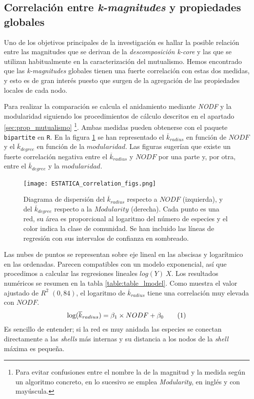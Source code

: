 \subsection{Correlación entre \textit{k-magnitudes} y propiedades globales}
\label{subsection:Correlacion}

Uno de los objetivos principales de la investigación es hallar la posible relación entre las magnitudes que se derivan de la \textit{descomposición k-core} y las que se utilizan habitualmente en la caracterización del mutualismo. Hemos encontrado que las \textit{k-magnitudes} globales tienen una fuerte correlación con estas dos medidas, y esto es de gran interés puesto que surgen de la agregación de las propiedades locales de cada nodo.

Para realizar la comparación se calcula el anidamiento mediante \textit{NODF} y la modularidad siguiendo los procedimientos de cálculo descritos en el apartado \ref{sec:prop_mutualismo} \footnote{Para evitar confusiones entre el nombre la de la magnitud y la medida según un algoritmo concreto, en lo sucesivo se emplea \textit{Modularity}, en inglés y con mayúscula.}. Ambas medidas pueden obtenerse con el paquete \texttt{bipartite} en \texttt{R}. En la figura \ref{fig:ESTATICA_corrfigs} se han representado el $\overline {k}_{radius}$ en función de $NODF$ y el $\overline {k}_{degree}$ en función de la $modularidad$. Las figuras sugerían que existe un fuerte correlación negativa entre el $\overline {k}_{radius}$ y $NODF$ por una parte y, por otra, entre el $\overline {k}_{degree}$ y la $modularidad$. 

\begin{figure}[h!]
\centering
\texttt{[image: ESTATICA\_correlation\_figs.png]}
\caption {Diagrama de dispersión del $\overline {k}_{radius}$ respecto a $NODF$ (izquierda), y del $\overline {k}_{degree}$ respecto a la $Modularity$ (derecha). Cada punto es una red, su área es proporcional al logaritmo del número de especies y el color indica la clase de comunidad. Se han incluido las líneas de regresión con sus intervalos de confianza en sombreado.}
\label{fig:ESTATICA_corrfigs}
\end{figure}

Las nubes de puntos se representan sobre eje lineal en las abscisas y logarítmico en las ordenadas. Parecen compatibles con un modelo exponencial, así que procedimos a calcular las regresiones lineales $log(Y) ~ X$. Los resultados numéricos se resumen en la tabla \ref{table:table_lmodel}. Como muestra el valor ajustado de $R^2$ $(0,84)$, el logaritmo de $\overline {k}_{radius}$ tiene una correlación muy elevada con $NODF$. 
\begin{align}
\displaystyle \log({\overline k_{radius}}) = \beta_1 \times NODF + \beta_0
\stepcounter{equation}\tag{\theequation}\label{eq:kradius_vs_nodf}
\end{align}
Es sencillo de entender; si la red es muy anidada las especies se conectan directamente a las \textit{shells} más internas y su distancia a los nodos de la \textit{shell} máxima es pequeña. 

